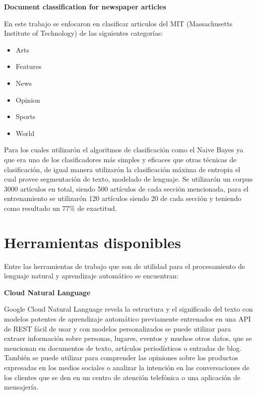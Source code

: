 \begin{large}
	 \textbf{Document classification for newspaper articles}\\
\end{large}

En este trabajo se enfocaron en clasificar articulos del MIT (Massachusetts Institute of Technology) de las siguientes categorías:

	\begin{itemize}
		\item Arts
		\item Features
		\item News
		\item Opinion
		\item Sports
		\item World
	\end{itemize}
Para los cuales utilizarón el algoritmos de clasificación como el Naive Bayes ya que era uno de los clasificadores más simples y eficaces que otras técnicas de clasificación, de igual manera utilizarón la clasificación máxima de entropia el cual provee segmentación de texto, modelado de lenguaje.
Se utilizarón un corpus 3000 artículos en total, siendo 500 artículos de cada sección mencionada, para el entrenamiento se utilizarón 120 artículos siendo 20 de cada sección y teniendo como resultado un 77\% de exactitud\cite{siete}.


\section{Herramientas disponibles}


Entre las herramientas de trabajo que son de utilidad para el procesamiento de lenguaje natural y aprendizaje automático se encuentran:\\

\begin{large}
	 \textbf{Cloud Natural Language}\\
\end{large}

Google Cloud Natural Language \cite{ocho} revela la estructura y el significado del texto con modelos potentes de aprendizaje automático previamente entrenados en una API de REST fácil de usar y con modelos personalizados se puede utilizar para extraer información sobre personas, lugares, eventos y muchos otros datos, que se mencionan en documentos de texto, artículos periodísticos o entradas de blog. También se puede utilizar para comprender las opiniones sobre los productos expresadas en los medios sociales o analizar la intención en las conversaciones de los clientes que se den en un centro de atención telefónica o una aplicación de mensajería.\\

